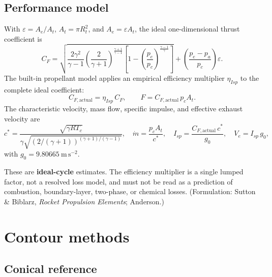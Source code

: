 \documentclass[11pt]{article}
\begin{document}
\subsection{Performance model}

With $\varepsilon = A_e/A_t$, $A_t=\pi R_t^2$, and $A_e=\varepsilon A_t$, the
ideal one-dimensional thrust coefficient is
\begin{equation}
C_F=
\sqrt{\frac{2\gamma^2}{\gamma-1}
\left(\frac{2}{\gamma+1}\right)^{\frac{\gamma+1}{\gamma-1}}
\left[1-\left(\frac{p_e}{p_c}\right)^{\frac{\gamma-1}{\gamma}}\right]}
+\left(\frac{p_e-p_a}{p_c}\right)\varepsilon .
\end{equation}
The built-in propellant model applies an empirical efficiency multiplier
$\eta_{Isp}$ to the complete ideal coefficient:
\begin{equation}
C_{F,\mathrm{actual}}=\eta_{Isp}\,C_F,
\qquad
F=C_{F,\mathrm{actual}}\,p_c A_t .
\end{equation}
The characteristic velocity, mass flow, specific impulse, and effective
exhaust velocity are
\begin{equation}
c^*=\frac{\sqrt{\gamma R T_c}}{\gamma\sqrt{\left(2/(\gamma+1)\right)^{(\gamma+1)/(\gamma-1)}}},
\quad
\dot m=\frac{p_c A_t}{c^*},
\quad
I_{sp}=\frac{C_{F,\mathrm{actual}}\,c^*}{g_0},
\quad
V_e=I_{sp}\,g_0 ,
\end{equation}
with $g_0 = 9.80665~\mathrm{m\,s^{-2}}$.

\begin{notebox}
\small These are \textbf{ideal-cycle} estimates. The efficiency multiplier is
a single lumped factor, not a resolved loss model, and must not be read as a
prediction of combustion, boundary-layer, two-phase, or chemical losses.
(Formulation: Sutton \& Biblarz, \emph{Rocket Propulsion Elements};
Anderson.)
\end{notebox}

\section{Contour methods}

\subsection{Conical reference}
\end{document}
